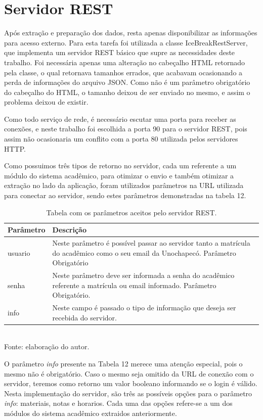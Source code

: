 \section{Servidor REST}
Após extração e preparação dos dados, resta apenas disponibilizar as informações para acesso externo. Para esta tarefa foi utilizada a classe IceBreakRestServer, que implementa um servidor REST básico que supre as necessidades deste trabalho. Foi necessária apenas uma alteração no cabeçalho HTML retornado pela classe, o qual retornava tamanhos errados, que acabavam ocasionando a perda de informações do arquivo JSON. Como não é um parâmetro obrigatório do cabeçalho do HTML, o tamanho deixou de ser enviado no mesmo, e assim o problema deixou de existir. 

Como todo serviço de rede, é necessário escutar uma porta para receber as conexões, e neste trabalho foi escolhida a porta 90 para o servidor REST, pois assim não ocasionaria um conflito com a porta 80 utilizada pelos servidores HTTP.

Como possuimos três tipos de retorno no servidor, cada um referente a um módulo do sistema acadêmico, para otimizar o envio e também otimizar a extração no lado da aplicação, foram utilizados parâmetros na URL utilizada para conectar ao servidor, sendo estes parâmetros demonstradas na tabela 12.

\begin{table}[!hbt]
\centering
\caption[Servidor REST - Parâmetros do Servidor]{Tabela com os parâmetros aceitos pelo servidor REST.}
\vspace{3mm}
\begin{tabular}{p{3cm}|p{9cm}}\hline
\textbf{Parâmetro} & \textbf{Descrição} \\ \hline
usuario            & Neste parâmetro é possível passar ao servidor tanto a matrícula do acadêmico como o seu email da Unochapecó. Parâmetro Obrigatório  \\ \hline
senha              & Neste parâmetro deve ser informada a senha do acadêmico referente a matrícula ou email informado. Parâmetro Obrigatório. \\ \hline
info               & Neste campo é passado o tipo de informação que deseja ser recebida do servidor. \\ \hline
\end{tabular}
\\ Fonte: elaboração do autor.
\end{table}

\newpage
O parâmetro \emph{info} presente na Tabela 12 merece uma atenção especial, pois o mesmo não é obrigatório. Caso o mesmo seja omitido da URL de conexão com o servidor, teremos como retorno um valor booleano informando se o login é válido. Nesta implementação do servidor, são três as possíveis opções para o parâmetro \emph{info}: materiais, notas e horarios. Cada uma das opções refere-se a um dos módulos do sistema acadêmico extraidos anteriormente.

